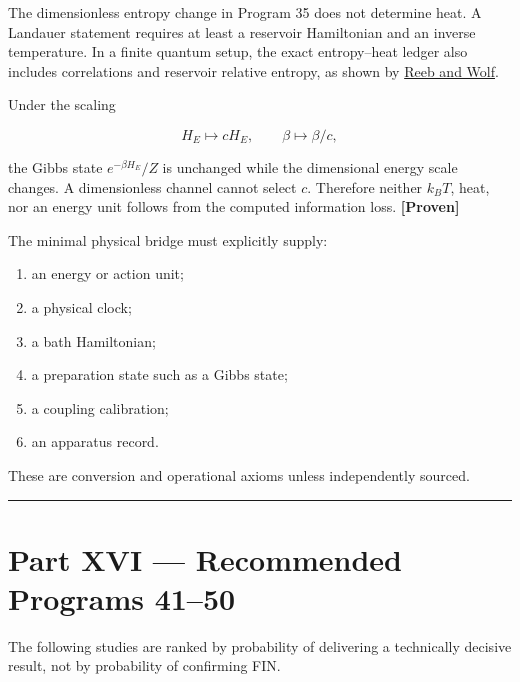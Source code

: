 \documentclass[11pt,a4paper,openany]{report}
\newcommand{\statusProven}{\textcolor{fingreen}{[Proven]}}
\begin{document}
The dimensionless entropy change in Program 35 does not determine heat. A Landauer statement requires at least a reservoir Hamiltonian and an inverse temperature. In a finite quantum setup, the exact entropy–heat ledger also includes correlations and reservoir relative entropy, as shown by \href{https://doi.org/10.1088/1367-2630/16/10/103011}{Reeb and Wolf}.

Under the scaling

\[
H_E\mapsto cH_E,
\qquad
\beta\mapsto\beta/c,
\]

the Gibbs state \(e^{-\beta H_E}/Z\) is unchanged while the dimensional energy scale changes. A dimensionless channel cannot select \(c\). Therefore neither \(k_BT\), heat, nor an energy unit follows from the computed information loss. \textbf{\statusProven{}}

The minimal physical bridge must explicitly supply:

\begin{enumerate}
\item 
an energy or action unit;

\item 
a physical clock;

\item 
a bath Hamiltonian;

\item 
a preparation state such as a Gibbs state;

\item 
a coupling calibration;

\item 
an apparatus record.

\end{enumerate}

These are conversion and operational axioms unless independently sourced.

\par\medskip\hrule\medskip

\chapter{Part XVI — Recommended Programs 41–50}

The following studies are ranked by probability of delivering a technically decisive result, not by probability of confirming FIN.
\end{document}
